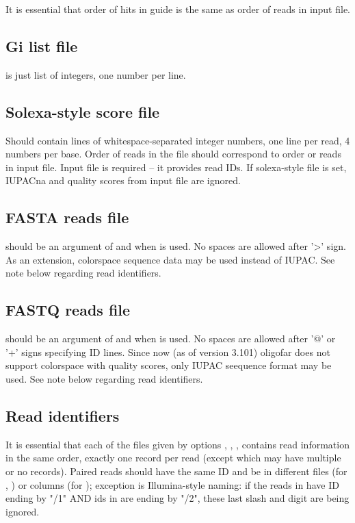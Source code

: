 \documentclass[english,letter]{article}
\begin{document}
    It is essential that order of hits in guide is the same as order of reads in
    input file.

\subsection{Gi list file}
    is just list of integers, one number per line.
    
\subsection{Solexa-style score file}
    Should contain lines of whitespace-separated integer numbers, one line per
    read, 4 numbers per base. Order of reads in the file should correspond to
    order or reads in input file. Input file is required -- it provides read
    IDs. If solexa-style file is set, IUPACna and quality scores from input
    file are ignored.

\subsection{FASTA reads file}
    should be an argument of  and  when  is used. No spaces are allowed
    after '>' sign. As an extension, colorspace sequence data may be used
    instead of IUPAC.  See note below regarding read identifiers.

\subsection{FASTQ reads file}
    should be an argument of  and  when  is used.  No spaces are
    allowed after '@' or '+' signs specifying ID lines.  Since now (as of
    version 3.101) oligofar does not support colorspace with quality scores,
    only IUPAC seequence format may be used. See note below regarding read
    identifiers.

\subsection{Read identifiers}
    It is essential that each of the files given by options , , , 
    contains read information in the same order, exactly one record per read
    (except  which may have multiple or no records).  Paired reads should
    have the same ID and be in different files (for , ) or columns 
    (for ); exception is Illumina-style naming: if the reads in  have ID
    ending by "/1" AND ids in  are ending by "/2", these last slash and 
    digit are being ignored. 
    
\end{document}
